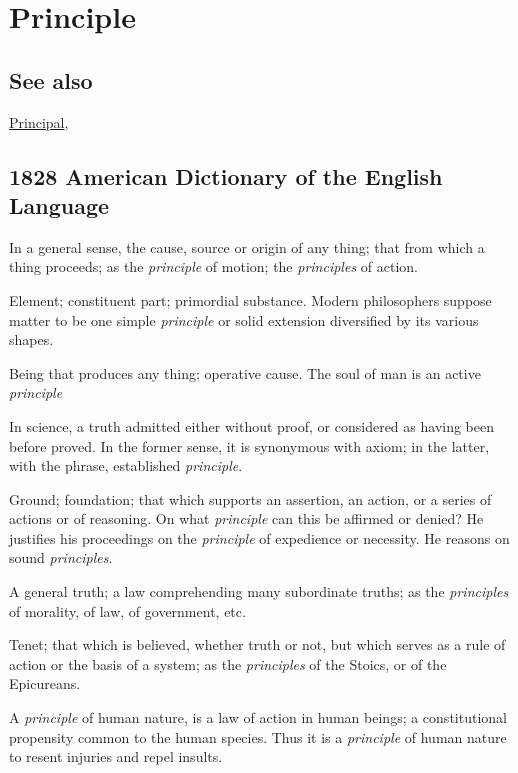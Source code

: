 \section{Principle}
	\label{PRINCIPLE}
	
\subsection{See also}

	\hyperref[PRINCIPAL]{Principal},

\subsection{1828 American Dictionary of the English Language} %
	\label{PRINCIPLE-1828}

	\begin{compactitem}
		\item[1] In a general sense, the cause, source or origin of any thing; that from which a thing proceeds; as the \textit{principle} of motion; the \textit{principles} of action.
		\item[2] Element; constituent part; primordial substance. Modern philosophers suppose matter to be one simple \textit{principle} or solid extension diversified by its various shapes.
		\item[3] Being that produces any thing; operative cause. The soul of man is an active \textit{principle}
		\item[4] In science, a truth admitted either without proof, or considered as having been before proved. In the former sense, it is synonymous with axiom; in the latter, with the phrase, established \textit{principle}.
		\item[5] Ground; foundation; that which supports an assertion, an action, or a series of actions or of reasoning. On what \textit{principle} can this be affirmed or denied? He justifies his proceedings on the \textit{principle} of expedience or necessity. He reasons on sound \textit{principles}.
		\item[6] A general truth; a law comprehending many subordinate truths; as the \textit{principles} of morality, of law, of government, etc.
		\item[7] Tenet; that which is believed, whether truth or not, but which serves as a rule of action or the basis of a system; as the \textit{principles} of the Stoics, or of the Epicureans.
		\item[8] A \textit{principle} of human nature, is a law of action in human beings; a constitutional propensity common to the human species. Thus it is a \textit{principle} of human nature to resent injuries and repel insults.
	\end{compactitem}

